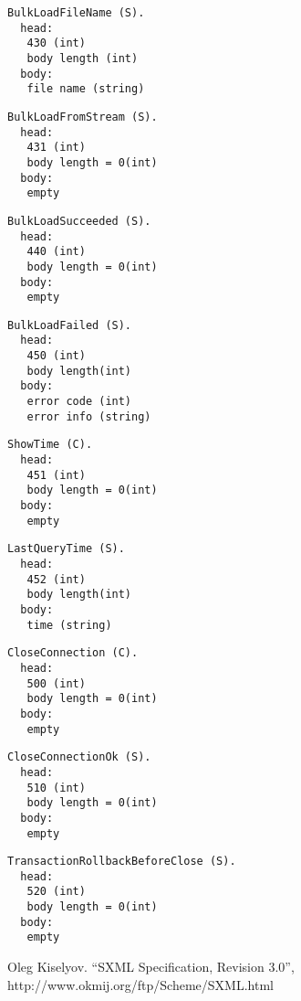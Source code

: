 \documentclass[a4paper,12pt]{article}
\begin{document}
\begin{verbatim}
BulkLoadFileName (S).
  head:
   430 (int)
   body length (int)
  body:
   file name (string)
\end{verbatim}

\begin{verbatim}
BulkLoadFromStream (S).
  head:
   431 (int)
   body length = 0(int)
  body:
   empty
\end{verbatim}

\begin{verbatim}
BulkLoadSucceeded (S).
  head:
   440 (int)
   body length = 0(int)
  body:
   empty
\end{verbatim}

\begin{verbatim}
BulkLoadFailed (S).
  head:
   450 (int)
   body length(int)
  body:
   error code (int)
   error info (string)
\end{verbatim}

\begin{verbatim}
ShowTime (C).
  head:
   451 (int)
   body length = 0(int)
  body:
   empty
\end{verbatim}

\begin{verbatim}
LastQueryTime (S).
  head:
   452 (int)
   body length(int)
  body:
   time (string)
\end{verbatim}

\begin{verbatim}
CloseConnection (C).
  head:
   500 (int)
   body length = 0(int)
  body:
   empty
\end{verbatim}

\begin{verbatim}
CloseConnectionOk (S).
  head:
   510 (int)
   body length = 0(int)
  body:
   empty
\end{verbatim}

\begin{verbatim}
TransactionRollbackBeforeClose (S).
  head:
   520 (int)
   body length = 0(int)
  body:
   empty
\end{verbatim}

\begin{thebibliography}{1}

Oleg Kiselyov.
``SXML Specification, Revision 3.0'',
http://www.okmij.org/ftp/Scheme/SXML.html
\end{thebibliography}
\end{document}
